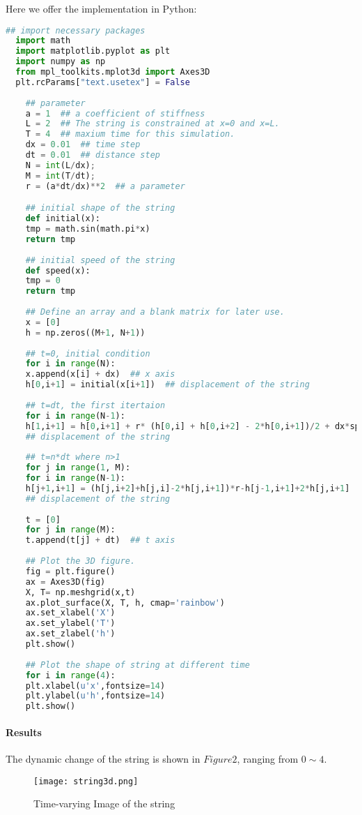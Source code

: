 \documentclass[11pt]{article}
\begin{document}
Here we offer the implementation in Python:

\begin{lstlisting}[language=Python]
  ## import necessary packages
  import math
  import matplotlib.pyplot as plt
  import numpy as np
  from mpl_toolkits.mplot3d import Axes3D  
  plt.rcParams["text.usetex"] = False
    
	## parameter
	a = 1  ## a coefficient of stiffness
	L = 2  ## The string is constrained at x=0 and x=L.
	T = 4  ## maxium time for this simulation.
	dx = 0.01  ## time step
	dt = 0.01  ## distance step
	N = int(L/dx);
	M = int(T/dt);
	r = (a*dt/dx)**2  ## a parameter

	## initial shape of the string
	def initial(x):
	tmp = math.sin(math.pi*x)
	return tmp
	
	## initial speed of the string
	def speed(x):
	tmp = 0
	return tmp
	
	## Define an array and a blank matrix for later use.
	x = [0]
	h = np.zeros((M+1, N+1))
	
	## t=0, initial condition
	for i in range(N):
	x.append(x[i] + dx)  ## x axis
	h[0,i+1] = initial(x[i+1])  ## displacement of the string
	
	## t=dt, the first itertaion
	for i in range(N-1):
	h[1,i+1] = h[0,i+1] + r* (h[0,i] + h[0,i+2] - 2*h[0,i+1])/2 + dx*speed(x[i+1])
	## displacement of the string
	
	## t=n*dt where n>1
	for j in range(1, M):
	for i in range(N-1):
	h[j+1,i+1] = (h[j,i+2]+h[j,i]-2*h[j,i+1])*r-h[j-1,i+1]+2*h[j,i+1]
	## displacement of the string
	
	t = [0]
	for j in range(M):
	t.append(t[j] + dt)  ## t axis
	
	## Plot the 3D figure.
	fig = plt.figure()
	ax = Axes3D(fig)
	X, T= np.meshgrid(x,t)
	ax.plot_surface(X, T, h, cmap='rainbow')
	ax.set_xlabel('X')
	ax.set_ylabel('T')
	ax.set_zlabel('h')
	plt.show()
	
	## Plot the shape of string at different time
	for i in range(4):
	plt.xlabel(u'x',fontsize=14)
	plt.ylabel(u'h',fontsize=14)
	plt.show()
\end{lstlisting}

\paragraph{Results}

The dynamic change of the string is shown in $Figure 2$, ranging from $0\sim 4$.

\begin{figure}[htb]
	\centering
	\texttt{[image: string3d.png]}       
	\caption{Time-varying Image of the string}
\end{figure}
\end{document}
